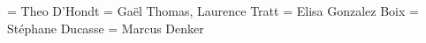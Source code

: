 \documentclass[a4paper,12pt,twoside]{../includes/ThesisStyle}
\begin{document}
\fi

\ThesisLilleI
\President = {
Theo D'Hondt
} 
\Rapporteurs = {
Ga\"el Thomas,
Laurence Tratt 
} 
\Examinateurs = {
Elisa Gonzalez Boix
} 
\Directeur = {
St\'ephane Ducasse
}
\Coencadreur = {
Marcus Denker}

\MakeThesisTitlePage 

\ifx\wholebook\relax\else
    
\end{document}
